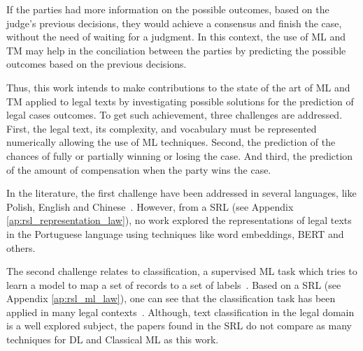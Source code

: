 If the parties had more information on the possible outcomes, based on the judge's previous decisions, they would achieve a consensus and finish the case, without the need of waiting for a judgment. In this context, the use of \gls{ML} and \gls{TM} may help in the conciliation between the parties by predicting the possible outcomes based on the previous decisions.  


Thus, this work intends to make contributions to the state of the art of \gls{ML} and \gls{TM} applied to legal texts by investigating possible solutions for the prediction of legal cases outcomes.
To get such achievement, three challenges are addressed. First, the legal text, its  complexity, and vocabulary must be represented numerically allowing the use of \gls{ML} techniques. Second, the prediction of the chances of fully or partially winning or losing the case. And third, the prediction of the amount of compensation when the party wins the case. 




In the literature, the first challenge have been addressed in several languages, like Polish, English and Chinese~\cite{Chalkidis2019, SmywiskiPohl2019}. However, from a \gls{SRL} (see Appendix \ref{ap:rsl_representation_law}), no work explored the representations of legal texts in the Portuguese language using techniques like word embeddings, \gls{BERT} and others.

The second challenge relates to classification, a supervised \gls{ML} task which tries to learn a model to map a set of records to a set of labels~\cite{Aggarwal2013}. Based on a \gls{SRL}  (see Appendix \ref{ap:rsl_ml_law}), one can see that the classification task has been applied in many legal contexts~\cite{Chalkidis2019,Hammami2019, Hassan2020}.
Although, text classification in the legal domain is a well explored subject, the papers found in the \gls{SRL} do not compare  as many techniques for \gls{DL} and Classical \gls{ML} as this work.

